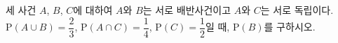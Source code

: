 세 사건 $A$, $B$, $C$에 대하여 $A$와 $B$는 서로 배반사건이고 $A$와 $C$는 서로 독립이다. $\mathrm{P}(A\cup B)=\dfrac{2}{3}$, $\mathrm{P}(A\cap C)=\dfrac{1}{4}$, $\mathrm{P}(C)=\dfrac{1}{2}$일 때, $\mathrm{P}(B)$를 구하시오.
